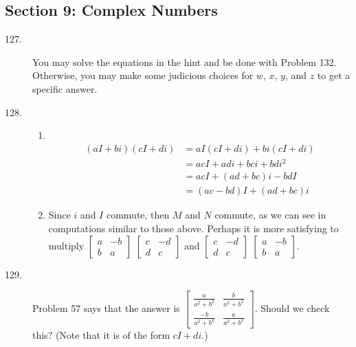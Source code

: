 \documentclass{article}
\begin{document}
\subsection*{Section 9: Complex Numbers}

\begin{description}

  \item[127.] You may solve the equations in the hint and be done with Problem 132. Otherwise, you may make some judicious choices for $w$, $x$, $y$, and $z$ to get a specific answer.

  \item[128.] 
    \begin{enumerate}[\hspace{1cm}(a)]
      \item $\ $
        \begin{align*}
        (aI+bi)(cI+di) & = aI(cI+di)+ bi(cI+di) \\
                       & = acI + adi + bci + bdi^2 \\
                       & = acI + (ad+bc)i - bdI \\
                       & = (ac-bd)I + (ad+bc)i 
        \end{align*}
      \item Since $i$ and $I$ commute, then $M$ and $N$ commute, as we can see in computations similar to those above. Perhaps it is more satisfying to multiply $\begin{bmatrix} a & -b \\ b & a \end{bmatrix}$ $\begin{bmatrix} c & -d \\ d & c \end{bmatrix}$ and $\begin{bmatrix} c & -d \\ d & c \end{bmatrix}$ $\begin{bmatrix} a & -b \\ b & a \end{bmatrix}$.
    \end{enumerate}

  \item[129.] Problem 57 says that the answer is $\begin{bmatrix} \frac{a}{a^2 + b^2} & \frac{b}{a^2 + b^2}  \\  \frac{-b}{a^2 + b^2} & \frac{a}{a^2 + b^2} \end{bmatrix}$. Should we check this? (Note that it is of the form $cI+di$.)


\end{description}
\end{document}
